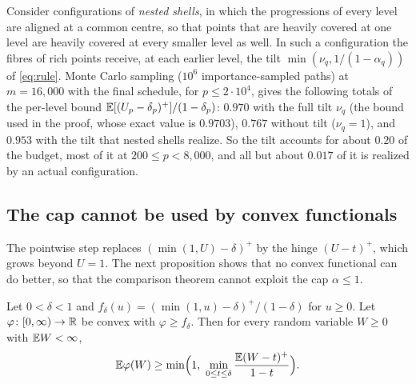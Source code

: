 \begin{observation}\label{obs:tilt}
Consider configurations of \emph{nested shells}, in which the progressions of every level are aligned at a common
centre, so that points that are heavily covered at one level are heavily covered at every smaller level as well. In
such a configuration the fibres of rich points receive, at each earlier level, the tilt
$\min(\nu_q,1/(1-\alpha_q))$ of \eqref{eq:rule}. Monte Carlo sampling ($10^6$ importance-sampled paths) at
$m=16{,}000$ with the final schedule, for $p\le2\cdot10^4$, gives the following totals of the per-level bound
$\mathbb{E}[(U_p-\delta_p)^+]/(1-\delta_p)$: $0.970$ with the full tilt $\nu_q$ (the bound used in the proof, whose exact value
is $0.9703$), $0.767$ without tilt ($\nu_q=1$), and $0.953$ with the tilt that nested shells realize. So the tilt
accounts for about $0.20$ of the budget, most of it at $200\le p<8{,}000$, and all but about $0.017$ of it is realized
by an actual configuration.
\end{observation}

\subsection{The cap cannot be used by convex functionals}

The pointwise step replaces $(\min(1,U)-\delta)^+$ by the hinge $(U-t)^+$, which grows beyond $U=1$. The next
proposition shows that no convex functional can do better, so that the comparison theorem cannot exploit the cap
$\alpha\le1$.

\begin{proposition}\label{prop:cap}
Let $0<\delta<1$ and $f_\delta(u)=(\min(1,u)-\delta)^+/(1-\delta)$ for $u\ge0$. Let $\varphi\colon[0,\infty)\to\mathbb{R}$ be
convex with $\varphi\ge f_\delta$. Then for every random variable $W\ge0$ with $\mathbb{E} W<\infty$,
\[
  \mathbb{E}\varphi(W)\ge\min\Bigl(1,\ \min_{0\le t\le\delta}\frac{\mathbb{E}(W-t)^+}{1-t}\Bigr).
\]
\end{proposition}

